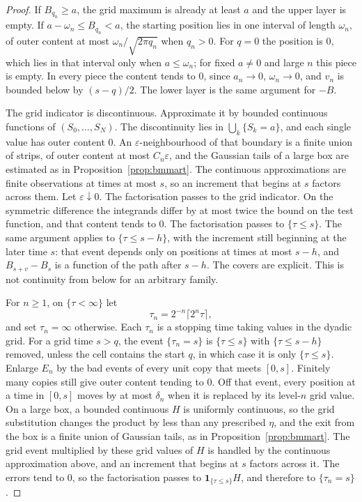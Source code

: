 \begin{proof}
If $B_{q_n}\ge a$, the grid maximum is already at least $a$ and the upper layer is empty. If $a-\omega_n\le B_{q_n}<a$, the starting position lies in one interval of length $\omega_n$, of outer content at most $\omega_n/\sqrt{2\pi q_n}$ when $q_n>0$. For $q=0$ the position is $0$, which lies in that interval only when $a\le\omega_n$; for fixed $a\neq0$ and large $n$ this piece is empty. In every piece the content tends to $0$, since $a_n\to0$, $\omega_n\to0$, and $v_n$ is bounded below by $(s-q)/2$. The lower layer is the same argument for $-B$.

The grid indicator is discontinuous. Approximate it by bounded continuous functions of $(S_0,\ldots,S_N)$. The discontinuity lies in $\bigcup_k\{S_k=a\}$, and each single value has outer content $0$. An $\varepsilon$-neighbourhood of that boundary is a finite union of strips, of outer content at most $C_n\varepsilon$, and the Gaussian tails of a large box are estimated as in Proposition~\ref{prop:bmmart}. The continuous approximations are finite observations at times at most $s$, so an increment that begins at $s$ factors across them. Let $\varepsilon\downarrow0$. The factorisation passes to the grid indicator. On the symmetric difference the integrands differ by at most twice the bound on the test function, and that content tends to $0$. The factorisation passes to $\{\tau\le s\}$. The same argument applies to $\{\tau\le s-h\}$, with the increment still beginning at the later time $s$: that event depends only on positions at times at most $s-h$, and $B_{s+v}-B_s$ is a function of the path after $s-h$. The covers are explicit. This is not continuity from below for an arbitrary family.

For $n\ge1$, on $\{\tau<\infty\}$ let
\[
 \tau_n=2^{-n}\lceil 2^n\tau\rceil,
\]
and set $\tau_n=\infty$ otherwise. Each $\tau_n$ is a stopping time taking values in the dyadic grid. For a grid time $s>q$, the event $\{\tau_n=s\}$ is $\{\tau\le s\}$ with $\{\tau\le s-h\}$ removed, unless the cell contains the start $q$, in which case it is only $\{\tau\le s\}$. Enlarge $E_n$ by the bad events of every unit copy that meets $[0,s]$. Finitely many copies still give outer content tending to $0$. Off that event, every position at a time in $[0,s]$ moves by at most $\delta_n$ when it is replaced by its level-$n$ grid value. On a large box, a bounded continuous $H$ is uniformly continuous, so the grid substitution changes the product by less than any prescribed $\eta$, and the exit from the box is a finite union of Gaussian tails, as in Proposition~\ref{prop:bmmart}. The grid event multiplied by these grid values of $H$ is handled by the continuous approximation above, and an increment that begins at $s$ factors across it. The errors tend to $0$, so the factorisation passes to $\mathbf 1_{\{\tau\le s\}}H$, and therefore to $\{\tau_n=s\}$.


\end{proof}
